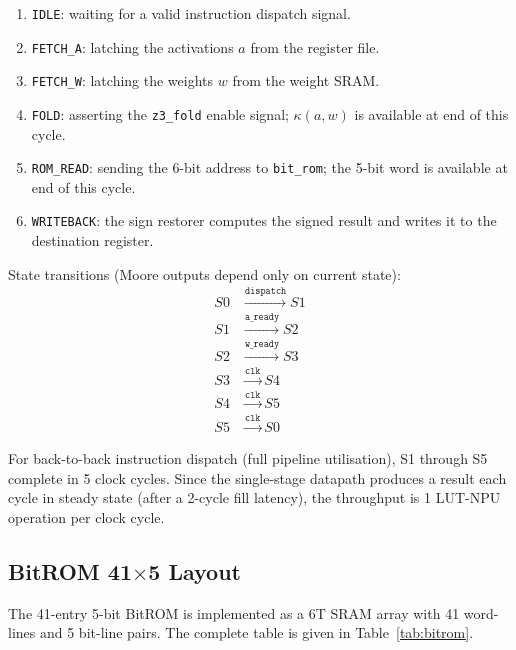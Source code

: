 \begin{enumerate}
  \item[\textbf{S0}] \texttt{IDLE}: waiting for a valid instruction
        dispatch signal.
  \item[\textbf{S1}] \texttt{FETCH\_A}: latching the activations
        \(a\) from the register file.
  \item[\textbf{S2}] \texttt{FETCH\_W}: latching the weights
        \(w\) from the weight SRAM.
  \item[\textbf{S3}] \texttt{FOLD}: asserting the \texttt{z3\_fold}
        enable signal; \(\kappa(a,w)\) is available at end of this cycle.
  \item[\textbf{S4}] \texttt{ROM\_READ}: sending the 6-bit address
        to \texttt{bit\_rom}; the 5-bit word is available at end of
        this cycle.
  \item[\textbf{S5}] \texttt{WRITEBACK}: the sign restorer
        computes the signed result and writes it to the destination
        register.
\end{enumerate}

State transitions (Moore outputs depend only on current state):
\begin{align*}
  S0 &\xrightarrow{\texttt{dispatch}} S1 \\
  S1 &\xrightarrow{\texttt{a\_ready}} S2 \\
  S2 &\xrightarrow{\texttt{w\_ready}} S3 \\
  S3 &\xrightarrow{\texttt{clk}} S4 \\
  S4 &\xrightarrow{\texttt{clk}} S5 \\
  S5 &\xrightarrow{\texttt{clk}} S0
\end{align*}

For back-to-back instruction dispatch (full pipeline utilisation), S1
through S5 complete in 5 clock cycles.  Since the single-stage datapath
produces a result each cycle in steady state (after a 2-cycle fill
latency), the throughput is 1 LUT-NPU operation per clock cycle.

\subsection{BitROM 41$\times$5 Layout}
\label{subsec:bitrom}

The 41-entry 5-bit BitROM is implemented as a 6T SRAM array with 41
word-lines and 5 bit-line pairs.  The complete table is given in
Table~\ref{tab:bitrom}.

